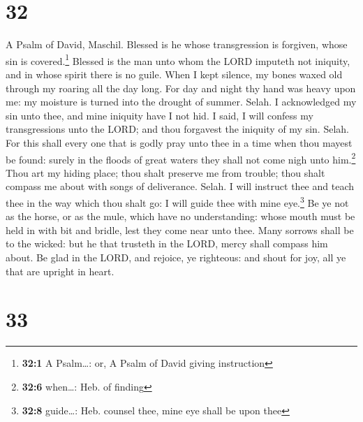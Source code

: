 \hypertarget{section-31}{%
\section{32}\label{section-31}}

A Psalm of David, Maschil.  Blessed is he whose
transgression is forgiven, whose sin is covered.\footnote{\textbf{32:1}
  A Psalm\ldots: or, A Psalm of David giving instruction} 
Blessed is the man unto whom the LORD imputeth not iniquity, and in
whose spirit there is no guile.  When I kept silence, my
bones waxed old through my roaring all the day long.  For
day and night thy hand was heavy upon me: my moisture is turned into the
drought of summer. Selah.  I acknowledged my sin unto
thee, and mine iniquity have I not hid. I said, I will confess my
transgressions unto the LORD; and thou forgavest the iniquity of my sin.
Selah.  For this shall every one that is godly pray unto
thee in a time when thou mayest be found: surely in the floods of great
waters they shall not come nigh unto him.\footnote{\textbf{32:6}
  when\ldots: Heb. of finding}  Thou art my hiding place;
thou shalt preserve me from trouble; thou shalt compass me about with
songs of deliverance. Selah.  I will instruct thee and
teach thee in the way which thou shalt go: I will guide thee with mine
eye.\footnote{\textbf{32:8} guide\ldots: Heb. counsel thee, mine eye
  shall be upon thee}  Be ye not as the horse, or as the
mule, which have no understanding: whose mouth must be held in with bit
and bridle, lest they come near unto thee.  Many sorrows
shall be to the wicked: but he that trusteth in the LORD, mercy shall
compass him about.  Be glad in the LORD, and rejoice, ye
righteous: and shout for joy, all ye that are upright in heart.

\hypertarget{section-32}{%
\section{33}\label{section-32}}


